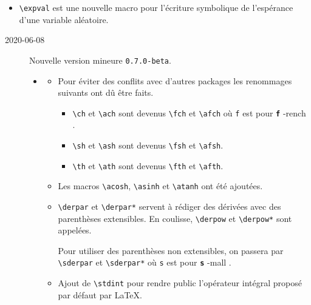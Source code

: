 \documentclass[12pt,a4paper]{book}
\makeatletter
\newcommand\env[1]{\texttt{#1}}
\newcommand\macro[1]{\env{\textbackslash{}#1}}
\theoremstyle{definition}
\newcommand\whyprefix[2]{%
	\textbf{\prefix{#1}}-#2%
}
\newcommand\prefix[1]{%
	\texttt{#1}%
}
\newcommand\topic{\@ifstar{\@topic@star}{\@topic@no@star}}
\newcommand\@topic@no@star[1]{%
	\textbf{\textsc{#1}.}%
}
\newcommand\@topic@star[1]{%
	\textbf{\textsc{#1} :}%
}
\makeatother
\begin{document}
{{\begin{description}
\begin{itemize}[itemsep=.5em]
\begin{itemize}[itemsep=.5em]
            \item \macro{expval} est une nouvelle macro pour l'écriture symbolique de l'espérance d'une  variable aléatoire.
        \end{itemize}
    \end{itemize}
    
\end{description}

\begin{description}    \item[2020-06-08] Nouvelle version mineure \verb+0.7.0-beta+.
    
    \begin{itemize}[itemsep=.5em]
        \item \topic{Analyse}
        \begin{itemize}[itemsep=.5em]
            \item Pour éviter des conflits avec d'autres packages les renommages suivants ont dû être faits.
            \begin{itemize}[itemsep=.5em, label=$\rightarrow$]
                \item \macro{ch} et \macro{ach} sont devenus \macro{fch} et \macro{afch} où \prefix{f} est pour \whyprefix{f}{rench}.
    
                \item \macro{sh} et \macro{ash} sont devenus \macro{fsh} et \macro{afsh}.
    
                \item \macro{th} et \macro{ath} sont devenus \macro{fth} et \macro{afth}.
            \end{itemize}
    
    		\item Les macros \macro{acosh}, \macro{asinh} et \macro{atanh} ont été ajoutées.
    
     		\item \macro{derpar} et \macro{derpar*} servent à rédiger des dérivées avec des parenthèses extensibles. En coulisse, \macro{derpow} et \macro{derpow*} sont appelées.
    
            Pour utiliser des parenthèses non extensibles, on passera par \macro{sderpar} et \macro{sderpar*} où \prefix{s} est pour \whyprefix{s}{mall}.
    
    		\item Ajout de \macro{stdint} pour rendre public l'opérateur intégral proposé par défaut par \LaTeX.
        \end{itemize}
    

\end{itemize}
\end{description}}}
\end{document}
